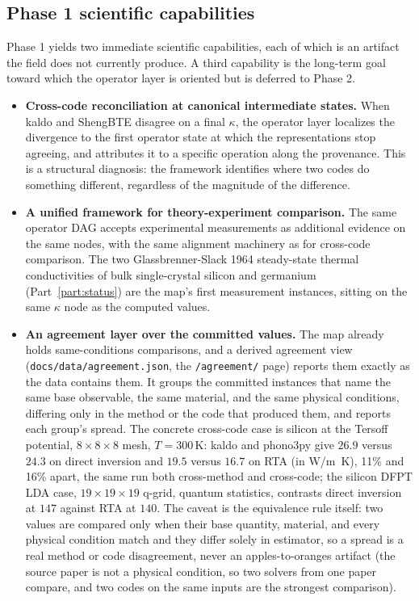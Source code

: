 \documentclass[11pt,a4paper]{article}
\begin{document}
\subsection{Phase 1 scientific capabilities}

Phase 1 yields two immediate scientific capabilities, each of which is an artifact the field does
not currently produce. A third capability is the long-term goal toward which the operator layer is
oriented but is deferred to Phase 2.

\begin{itemize}[leftmargin=2em]
  \item \textbf{Cross-code reconciliation at canonical intermediate states.} When kaldo and
        ShengBTE disagree on a final $\kappa$, the operator layer localizes the divergence to the
        first operator state at which the representations stop agreeing, and attributes it to a
        specific operation along the provenance. This is a structural diagnosis: the framework
        identifies where two codes do something different, regardless of the magnitude of the
        difference.
  \item \textbf{A unified framework for theory-experiment comparison.} The same operator DAG
        accepts experimental measurements as additional evidence on the same nodes,
        with the same alignment machinery as for cross-code comparison. The two
        Glassbrenner-Slack 1964 steady-state thermal conductivities of bulk
        single-crystal silicon and germanium (Part~\ref{part:status}) are the map's
        first measurement instances, sitting on the same $\kappa$ node as the
        computed values.
  \item \textbf{An agreement layer over the committed values.} The map already holds
        same-conditions comparisons, and a derived agreement view
        (\texttt{docs/data/agreement.json}, the \texttt{/agreement/} page) reports
        them exactly as the data contains them. It groups the committed
        instances that name the same base observable, the same material, and the
        same physical conditions, differing only in the method or the code that
        produced them, and reports each group's spread. The concrete cross-code
        case is silicon at the Tersoff potential, $8\times 8\times 8$ mesh,
        $T=300\,\text{K}$: kaldo and phono3py give $26.9$ versus $24.3$ on direct
        inversion and $19.5$ versus $16.7$ on RTA (in W/m~K), 11\% and 16\% apart, the same run
        both cross-method and cross-code; the silicon DFPT LDA case, $19\times
        19\times 19$ q-grid, quantum statistics, contrasts direct inversion at
        $147$ against RTA at $140$. The caveat is the equivalence rule
        itself: two values are compared only when their base quantity, material,
        and every physical condition match and they differ solely in estimator,
        so a spread is a real method or code disagreement, never an
        apples-to-oranges artifact (the source paper is not a physical condition,
        so two solvers from one paper compare, and two codes on the same inputs
        are the strongest comparison).
\end{itemize}
\end{document}
